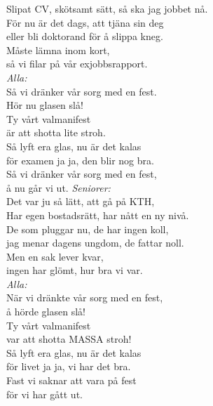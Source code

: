 \documentclass[a6paper,10pt]{article}
\begin{document}
Slipat CV, skötsamt sätt, så ska jag jobbet nå. \\
För nu är det dags, att tjäna sin deg \\
eller bli doktorand för å slippa kneg. \\
Måste lämna inom kort,  \\
så vi filar på vår exjobbsrapport.
\vspace{5pt} \\
\textit{Alla:} \\
Så vi dränker vår sorg med en fest. \\
Hör nu glasen slå! \\
Ty vårt valmanifest \\
är att shotta lite stroh. \\
Så lyft era glas, nu är det kalas \\
för examen ja ja, den blir nog bra. \\
Så vi dränker vår sorg med en fest, \\
å nu går vi ut.
\newpage
\setlength{\oddsidemargin}{-0.47in}
\noindent
\textit{Seniorer:} \\
Det var ju så lätt, att gå på KTH, \\
Har egen bostadsrätt, har nått en ny nivå. \\
De som pluggar nu, de har ingen koll, \\
jag menar dagens ungdom, de fattar noll. \\
Men en sak lever kvar,  \\
ingen har glömt, hur bra vi var.
\vspace{5pt} \\
\textit{Alla:} \\
När vi dränkte vår sorg med en fest, \\
å hörde glasen slå! \\
Ty vårt valmanifest \\
var att shotta MASSA stroh! \\
Så lyft era glas, nu är det kalas \\
för livet ja ja, vi har det bra. \\
Fast vi saknar att vara på fest \\
för vi har gått ut.

\end{document}
